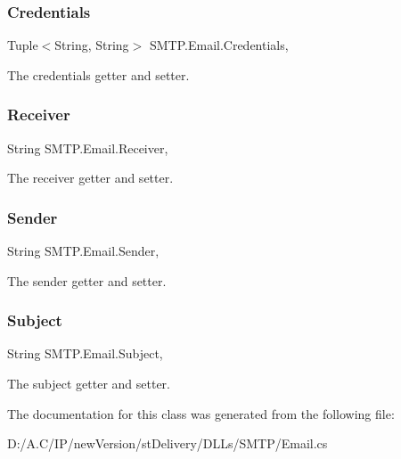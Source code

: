 \subsubsection{\texorpdfstring{Credentials}{Credentials}}
{\footnotesize\ttfamily Tuple$<$String, String$>$ S\+M\+T\+P.\+Email.\+Credentials\hspace{0.3cm}{\ttfamily [get]}, {\ttfamily [set]}}



The credentials getter and setter. 

\mbox{\label{class_s_m_t_p_1_1_email_aa0b48143973676c8cbc3bb4fd9c4efce}} 
\subsubsection{\texorpdfstring{Receiver}{Receiver}}
{\footnotesize\ttfamily String S\+M\+T\+P.\+Email.\+Receiver\hspace{0.3cm}{\ttfamily [get]}, {\ttfamily [set]}}



The receiver getter and setter. 

\mbox{\label{class_s_m_t_p_1_1_email_adf416a1fa24ab5d55e8ed451ac0727b5}} 
\subsubsection{\texorpdfstring{Sender}{Sender}}
{\footnotesize\ttfamily String S\+M\+T\+P.\+Email.\+Sender\hspace{0.3cm}{\ttfamily [get]}, {\ttfamily [set]}}



The sender getter and setter. 

\mbox{\label{class_s_m_t_p_1_1_email_afedbc5aa7e9e35815b04d6c9d11ae6ee}} 
\subsubsection{\texorpdfstring{Subject}{Subject}}
{\footnotesize\ttfamily String S\+M\+T\+P.\+Email.\+Subject\hspace{0.3cm}{\ttfamily [get]}, {\ttfamily [set]}}



The subject getter and setter. 



The documentation for this class was generated from the following file\+:\begin{DoxyCompactItemize}
\item 
D\+:/\+A.\+C/\+I\+P/new\+Version/st\+Delivery/\+D\+L\+Ls/\+S\+M\+T\+P/Email.\+cs\end{DoxyCompactItemize}
